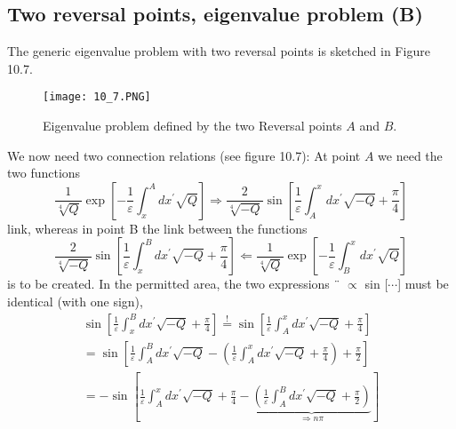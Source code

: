 \subsection{Two reversal points, eigenvalue problem (B)}
The generic eigenvalue problem with two reversal points is sketched in Figure 10.7.
\begin{figure}[ht]
    \begin{minipage}{0.5\textwidth}
        \centering
        \texttt{[image: 10\_7.PNG]}
    \end{minipage}
    \begin{minipage}{0.5\textwidth}
        \caption{Eigenvalue problem defined by the two
        Reversal points $A$ and $B$.}
    \end{minipage}
\end{figure}
We now need two connection relations (see figure 10.7): At point $A$ we need the two functions
\begin{equation}
    \frac{1}{\sqrt[4]{Q}} \exp \left[-\frac{1}{\varepsilon} \int_{x}^{A} d x^{\prime} \sqrt{Q}\right] \Longrightarrow \frac{2}{\sqrt[4]{-Q}} \sin \left[\frac{1}{\varepsilon} \int_{A}^{x} d x^{\prime} \sqrt{-Q}+\frac{\pi}{4}\right]
    \end{equation}
link, whereas in point B the link between the functions
\begin{equation}
    \frac{2}{\sqrt[4]{-Q}} \sin \left[\frac{1}{\varepsilon} \int_{x}^{B} d x^{\prime} \sqrt{-Q}+\frac{\pi}{4}\right] \Longleftarrow \frac{1}{\sqrt[4]{Q}} \exp \left[-\frac{1}{\varepsilon} \int_{B}^{x} d x^{\prime} \sqrt{Q}\right]
    \end{equation}
is to be created. In the permitted area, the two expressions ¨ $\propto$ sin [$\cdots$] must be identical (with one sign),
\begin{equation}
\begin{array}{l}{\sin \left[\frac{1}{\varepsilon} \int_{x}^{B} d x^{\prime} \sqrt{-Q}+\frac{\pi}{4}\right] \stackrel{!}{=} \sin \left[\frac{1}{\varepsilon} \int_{A}^{x} d x^{\prime} \sqrt{-Q}+\frac{\pi}{4}\right]} \\ {=\sin \left[\frac{1}{\varepsilon} \int_{A}^{B} d x^{\prime} \sqrt{-Q}-\left(\frac{1}{\varepsilon} \int_{A}^{x} d x^{\prime} \sqrt{-Q}+\frac{\pi}{4}\right)+\frac{\pi}{2}\right]} \\ {=-\sin \left[\frac{1}{\varepsilon} \int_{A}^{x} d x^{\prime} \sqrt{-Q}+\frac{\pi}{4}-\underbrace{\left(\frac{1}{\varepsilon} \int_{A}^{B} d x^{\prime} \sqrt{-Q}+\frac{\pi}{2}\right)}_{\Rightarrow n \pi}\right]}\end{array}
\end{equation}
